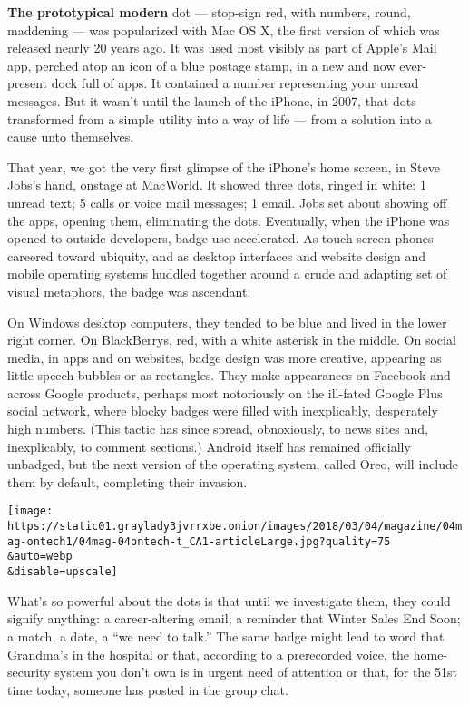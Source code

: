 \textbf{The prototypical modern} dot --- stop-sign red, with numbers,
round, maddening --- was popularized with Mac OS X, the first version of
which was released nearly 20 years ago. It was used most visibly as part
of Apple's Mail app, perched atop an icon of a blue postage stamp, in a
new and now ever-present dock full of apps. It contained a number
representing your unread messages. But it wasn't until the launch of the
iPhone, in 2007, that dots transformed from a simple utility into a way
of life --- from a solution into a cause unto themselves.

That year, we got the very first glimpse of the iPhone's home screen, in
Steve Jobs's hand, onstage at MacWorld. It showed three dots, ringed in
white: 1 unread text; 5 calls or voice mail messages; 1 email. Jobs set
about showing off the apps, opening them, eliminating the dots.
Eventually, when the iPhone was opened to outside developers, badge use
accelerated. As touch-screen phones careered toward ubiquity, and as
desktop interfaces and website design and mobile operating systems
huddled together around a crude and adapting set of visual metaphors,
the badge was ascendant.

On Windows desktop computers, they tended to be blue and lived in the
lower right corner. On BlackBerrys, red, with a white asterisk in the
middle. On social media, in apps and on websites, badge design was more
creative, appearing as little speech bubbles or as rectangles. They make
appearances on Facebook and across Google products, perhaps most
notoriously on the ill-fated Google Plus social network, where blocky
badges were filled with inexplicably, desperately high numbers. (This
tactic has since spread, obnoxiously, to news sites and, inexplicably,
to comment sections.) Android itself has remained officially unbadged,
but the next version of the operating system, called Oreo, will include
them by default, completing their invasion.

\texttt{[image: https://static01.graylady3jvrrxbe.onion/images/2018/03/04/magazine/04mag-ontech1/04mag-04ontech-t\_CA1-articleLarge.jpg?quality=75\\\&auto=webp\\\&disable=upscale]}

What's so powerful about the dots is that until we investigate them,
they could signify anything: a career-altering email; a reminder that
Winter Sales End Soon; a match, a date, a ``we need to talk.'' The same
badge might lead to word that Grandma's in the hospital or that,
according to a prerecorded voice, the home-security system you don't own
is in urgent need of attention or that, for the 51st time today, someone
has posted in the group chat.

